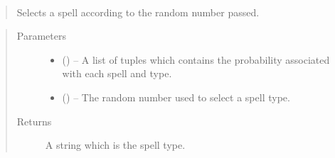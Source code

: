 \documentclass[letterpaper,10pt,english]{sphinxmanual}
\begin{document}
\begin{fulllineitems}
\label{\detokenize{code:hp_spells.getSpellType}}~\begin{quote}

Selects a spell according to the random number passed.
\end{quote}
\begin{quote}\begin{description}
\item[{Parameters}] \leavevmode\begin{itemize}
\item {} 
 (\sphinxstyleliteralemphasis{}\sphinxstyleliteralemphasis{{[}}\sphinxstyleliteralemphasis{}\sphinxstyleliteralemphasis{(}\sphinxstyleliteralemphasis{,}\sphinxstyleliteralemphasis{,}\sphinxstyleliteralemphasis{)}\sphinxstyleliteralemphasis{{]}}\sphinxstyleliteralemphasis{}) -- A list of tuples which contains the probability associated with each spell and type.

\item {} 
 () -- The random number used to select a spell type.

\end{itemize}

\item[{Returns}] \leavevmode
A string which is the spell type.

\end{description}\end{quote}

\end{fulllineitems}

\end{document}
